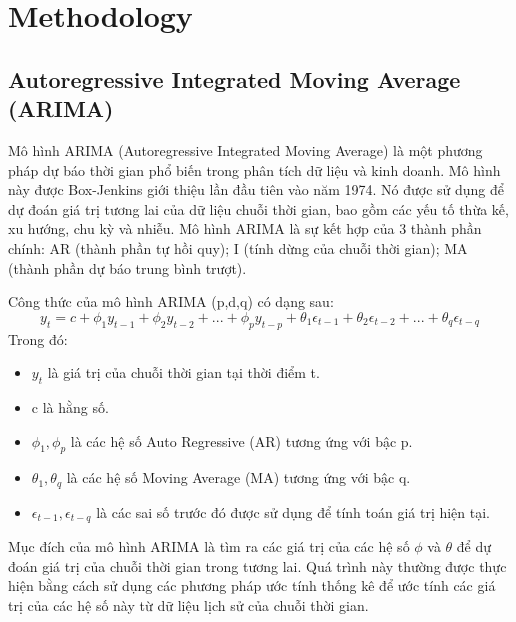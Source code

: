 \documentclass{ieeeojies}
\begin{document}
\section{Methodology}
\subsection{Autoregressive Integrated Moving Average (ARIMA)}
Mô hình ARIMA (Autoregressive Integrated Moving Average) là một phương pháp dự báo thời gian phổ biến trong phân tích dữ liệu và kinh doanh. Mô hình này được Box-Jenkins giới thiệu lần đầu tiên vào năm 1974. Nó được sử dụng để dự đoán giá trị tương lai của dữ liệu chuỗi thời gian, bao gồm các yếu tố thừa kế, xu hướng, chu kỳ và nhiễu.
Mô hình ARIMA là sự kết hợp của 3 thành phần chính: AR (thành phần tự hồi quy); I (tính dừng của chuỗi thời gian); MA (thành phần dự báo trung bình trượt).

Công thức của mô hình ARIMA (p,d,q) có dạng sau:
\[
y_{t} = c + \phi_{1}y_{t-1} + \phi_{2}y_{t-2} + ... + \phi_{p}y_{t-p} + \theta_{1}\epsilon_{t-1} + \theta_{2}\epsilon_{t-2} + ... + \theta_{q}\epsilon_{t-q}
\]
Trong đó:
\begin{itemize}
    \item \(y_{t}\) là giá trị của chuỗi thời gian tại thời điểm t.
    \item c là hằng số.
    \item \(\phi_{1}, \phi_{p}\) là các hệ số Auto Regressive (AR) tương ứng với bậc p.
    \item \(\theta_{1}, \theta_{q}\) là các hệ số Moving Average (MA) tương ứng với bậc q.
    \item \(\epsilon_{t-1}, \epsilon_{t-q}\) là các sai số trước đó được sử dụng để tính toán giá trị hiện tại.
\end{itemize}

Mục đích của mô hình ARIMA là tìm ra các giá trị của các hệ số \(\phi\) và \(\theta\) để dự đoán giá trị của chuỗi thời gian trong tương lai. Quá trình này thường được thực hiện bằng cách sử dụng các phương pháp ước tính thống kê để ước tính các giá trị của các hệ số này từ dữ liệu lịch sử của chuỗi thời gian.
\end{document}
